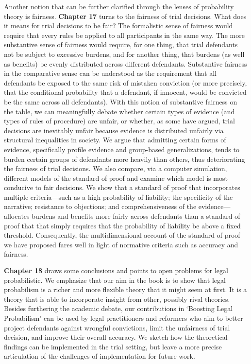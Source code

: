\documentclass[
  10pt,
  dvipsnames,enabledeprecatedfontcommands]{scrartcl}
\newcommand{\raf}[1]{\todo[color=olive!40]{#1}}
\begin{document}
Another notion that can be further clarified through the lenses of
probability theory is fairness. \textbf{Chapter 17} turns to the
fairness of trial decisions. What does it means for trial decisions to
be fair? The formalistic sense of fairness would require that every
rules be applied to all participants in the same way. The more
substantive sense of fairness would require, for one thing, that trial
defendants not be subject to excessive burdens, and for another thing,
that burdens (as well as benefits) be evenly distributed across
different defendants. Substantive fairness in the comparative sense can
be understood as the requirement that all defendants be exposed to the
same risk of mistaken conviction (or more precisely, that the
conditional probability that a defendant, if innocent, would be
convicted be the same across all defendants). With this notion of
substantive fairness on the table, we can meaningfully debate whether
certain types of evidence (and types of rules of procedure) are unfair,
or whether, as some have argued, trial decisions are inevitably unfair
because evidence is distributed unfairly via structural inequalities in
society. We argue that admitting certain forms of evidence, specifically
profile evidence and group-based generalizations, tends to burden
certain groups of defendants more heavily than others, thus
deteriorating the fairness of trial decisions. We also compare, via a
computer simulation, different models of the standard of proof and
examine which model is most conducive to fair decisions. We show that a
standard of proof that incorporates multiple criteria---such as a high
probability of liability; the specificity of the narrative; resistance
to objections; and comprehensiveness of the evidence---allocates burdens
and benefits more fairly across defendants than a standard of proof that
that simply requires that the probability of liability be above a fixed
threshold. Consequently, the multidimensional account of the standard of
proof we have proposed fares well in light of normative criteria such as
accuracy and fairness.
\raf{M: Does this make sense? Anythign to add or remove?}

\textbf{Chapter 18} draws some conclusions and points to open problems
for legal probabilistic. We emphasize that our aim in the book is to
show that legal probabilism is a richer and more flexible theory that it
might seem at first. It is a theory that is able to incorporate insight
from other, possibly rival theories. Besides furthering the academic
debate, our contributions in `Boosting Legal Probabilism' can be used by
legal practitioners and reformers who aim to better project defendants
against wrongful convictions, limit the unfairness of trial decision,
and improve their overall accuracy. We sketch how the theoretical
findings can be implemented in the trial setting, but leave a more
precise articulation of the challenges of implementation for future
work.
\end{document}
